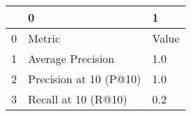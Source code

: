\begin{tabular}{lll}
\toprule
{} &                       0 &      1 \\
\midrule
0 &                  Metric &  Value \\
1 &       Average Precision &    1.0 \\
2 &  Precision at 10 (P@10) &    1.0 \\
3 &     Recall at 10 (R@10) &    0.2 \\
\bottomrule
\end{tabular}
